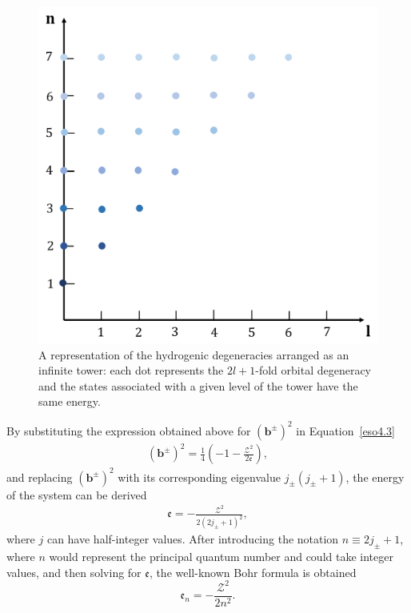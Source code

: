 \documentclass[12pt,a4paper]{report}
\theoremstyle{definition}
\theoremstyle{remark}
\theoremstyle{remark}
\begin{document}
\begin{figure}[!hbt]
\begin{center}
\includegraphics[width=0.7\columnwidth]{tower_1.png}
\caption{A representation of the hydrogenic degeneracies arranged as an infinite tower: each dot represents the $2l+1$-fold orbital degeneracy and the states associated with a given level of the tower have the same energy.}
\label{fig:tower_1}
\end{center}
\end{figure}

By substituting the expression obtained above for $(\textbf{b}^\pm)^2$ in Equation~\ref{eso4.3}
\begin{align*}
(\textbf{b}^\pm)^2 =\frac{1}{4}\left(-1 -\frac{\mathcal{Z}^2}{2\mathfrak{e}}\right),
\end{align*}
and replacing $(\textbf{b}^\pm)^2$ with its corresponding eigenvalue $j_\pm(j_\pm+1)$, the energy of the system can be derived
\begin{align*}
\mathfrak{e}=-\frac{\mathcal{Z}^2}{2(2j_\pm+1)^2},
\end{align*}
where $j$ can have half-integer values. After introducing the notation $n\equiv 2j_\pm+1$, where $n$ would represent the principal quantum number and could take integer values, and then solving for $\mathfrak{e}$, the well-known Bohr formula is obtained
\begin{equation}\label{eso4.5}
\mathfrak{e}_n=-\frac{\mathcal{Z}^2}{2n^2}.
\end{equation}
\end{document}
